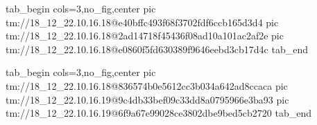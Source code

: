  
 
 
 
 

\qqSecCmtScr


\ifcmt
  tab_begin cols=3,no_fig,center
    pic tm://18_12_22.10.16.18@e40bffc493f68f3702fdf6ccb165d3d4
    pic tm://18_12_22.10.16.18@2ad14718f45436f08ad10a101ac2af2e
    pic tm://18_12_22.10.16.18@e0860f5fd630389f9646eebd3cb17d4c
  tab_end
\fi


\ifcmt
  tab_begin cols=3,no_fig,center
    pic tm://18_12_22.10.16.18@836574b0e5612cc3b034a642ad8ccaca
    pic tm://18_12_22.10.16.19@9c4db33bef09c33dd8a0795966e3ba93
    pic tm://18_12_22.10.16.19@6f9a67e99028ce3802dbe9bed5cb2720
  tab_end
\fi


